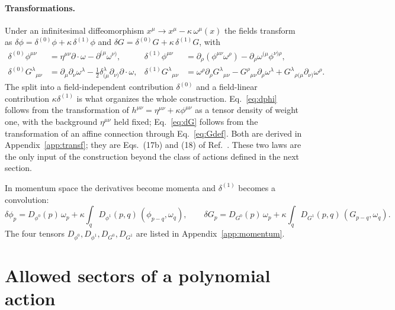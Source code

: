 \documentclass[prd,aps,preprint,nofootinbib,amsmath,amssymb,eqsecnum]{revtex4-2}
\newcommand{\ip}[1]{\int_{#1}}
\begin{document}
\paragraph{Transformations.} Under an infinitesimal diffeomorphism
$x^\mu\to x^\mu-\kappa\,\omega^\mu(x)$ the fields transform as
$\delta\phi=\delta^{(0)}\phi+\kappa\,\delta^{(1)}\phi$ and $\delta G=\delta^{(0)}G+\kappa\,\delta^{(1)}G$, with
\begin{align}
\delta^{(0)}\phi^{\mu\nu}&=\eta^{\mu\nu}\partial\!\cdot\!\omega-\partial^{(\mu}\omega^{\nu)},&
\delta^{(1)}\phi^{\mu\nu}&=\partial_\rho(\phi^{\mu\nu}\omega^\rho)-\partial_\rho\omega^{(\mu}\phi^{\nu)\rho},
\label{eq:dphi}\\
\delta^{(0)}G^{\lambda}{}_{\mu\nu}&=\partial_\mu\partial_\nu\omega^\lambda-\tfrac12\delta^{\lambda}_{(\mu}\partial_{\nu)}\partial\!\cdot\!\omega,&
\delta^{(1)}G^{\lambda}{}_{\mu\nu}&=\omega^\rho\partial_\rho G^{\lambda}{}_{\mu\nu}-G^{\rho}{}_{\mu\nu}\partial_\rho\omega^\lambda
+G^{\lambda}{}_{\rho(\mu}\partial_{\nu)}\omega^\rho.
\label{eq:dG}
\end{align}
The split into a field-independent contribution $\delta^{(0)}$ and a field-linear contribution
$\kappa\delta^{(1)}$ is what organizes the whole construction.
Eq.~\eqref{eq:dphi} follows from the transformation of $h^{\mu\nu}=\eta^{\mu\nu}+\kappa\phi^{\mu\nu}$
as a tensor density of weight one, with the background $\eta^{\mu\nu}$ held fixed;
Eq.~\eqref{eq:dG} follows from the transformation of an affine connection through
Eq.~\eqref{eq:Gdef}. Both are derived in Appendix~\ref{app:transf}; they are
Eqs.~(17b) and (18) of Ref.~\cite{BrandtMcKeon2015}. These two laws are the only input of the
construction beyond the class of actions defined in the next section.

In momentum space the derivatives become momenta and $\delta^{(1)}$ becomes a convolution:
\begin{equation}
\delta\phi_p=D_{\phi^0}(p)\,\omega_p+\kappa\ip{q}D_{\phi^1}(p,q)\,(\phi_{p-q},\omega_q),\qquad
\delta G_p=D_{G^0}(p)\,\omega_p+\kappa\ip{q}D_{G^1}(p,q)\,(G_{p-q},\omega_q).
\label{eq:dmom}
\end{equation}
The four tensors $D_{\phi^0},D_{\phi^1},D_{G^0},D_{G^1}$ are listed in Appendix~\ref{app:momentum}.

\section{Allowed sectors of a polynomial action}
\label{sec:closure}
\end{document}

